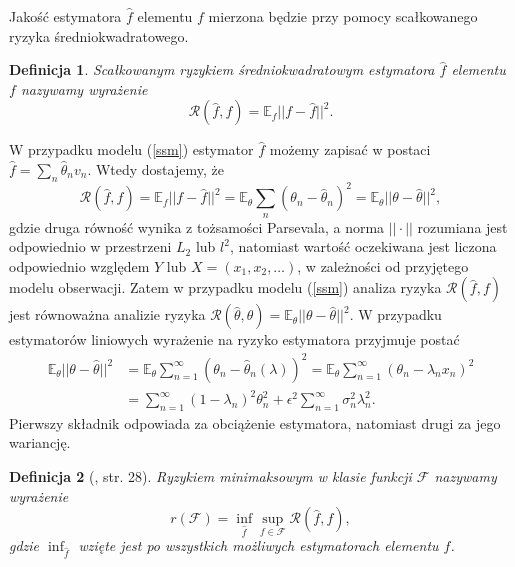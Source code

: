 \documentclass[man,mfiu]{mgrwms}
\newtheorem{df}{Definicja}[chapter]
\begin{document}
Jakość estymatora $\hat{f}$ elementu $f$ mierzona będzie przy pomocy scałkowanego ryzyka średniokwadratowego.
\begin{df}
Scałkowanym ryzykiem średniokwadratowym estymatora $\hat{f}$ elementu $f$ nazywamy wyrażenie
\begin{displaymath}
\mathcal{R}(\hat{f},f)=\mathbb{E}_f||f-\hat{f}||^2.
\end{displaymath}
\end{df}
W przypadku modelu (\ref{ssm}) estymator $\hat{f}$ możemy zapisać w postaci $\hat{f}=\sum_n\hat{\theta}_nv_n$. Wtedy dostajemy, że 
\begin{displaymath}
\mathcal{R}(\hat{f},f)=\mathbb{E}_f||f-\hat{f}||^2=\mathbb{E}_{\theta}\sum_n\left(\theta_n-\hat{\theta}_n\right)^2=\mathbb{E}_{\theta}||\theta-\hat{\theta}||^2,
\end{displaymath}
gdzie druga równość wynika z tożsamości Parsevala, a norma $||\cdot ||$ rozumiana jest odpowiednio w przestrzeni $L_2$ lub $l^2$, natomiast wartość oczekiwana jest liczona odpowiednio względem $Y$ lub $X=(x_1,x_2,\dots)$, w zależności od przyjętego modelu obserwacji. Zatem w przypadku modelu (\ref{ssm}) analiza ryzyka $\mathcal{R}(\hat{f},f)$ jest równoważna analizie ryzyka $\mathcal{R}(\hat{\theta},\theta)=\mathbb{E}_{\theta}||\theta-\hat{\theta}||^2$. W przypadku estymatorów liniowych wyrażenie na ryzyko estymatora przyjmuje postać 
\begin{equation}\label{risk}
\begin{split}
\mathbb{E}_{\theta}||\theta-\hat{\theta}||^2&=\mathbb{E}_{\theta}\sum_{n=1}^{\infty}\left(\theta_n-\hat{\theta}_n(\lambda)\right)^2=\mathbb{E}_{\theta}\sum_{n=1}^{\infty}\left(\theta_n-\lambda_nx_n\right)^2\\
&=\sum_{n=1}^{\infty}(1-\lambda_n)^2\theta_n^2+\epsilon^2\sum_{n=1}^{\infty}\sigma_n^2\lambda_n^2.
\end{split}
\end{equation}
Pierwszy składnik odpowiada za obciążenie estymatora, natomiast drugi za jego wariancję.\\
\begin{df}[\cite{iphde}, str. 28] Ryzykiem minimaksowym w klasie funkcji $\mathcal{F}$ nazywamy wyrażenie 
\begin{displaymath}
r(\mathcal{F})=\inf_{\hat{f}}\sup_{f\in \mathcal{F}}\mathcal{R}(\hat{f},f),
\end{displaymath}
gdzie $\inf_{\hat{f}}$ wzięte jest po wszystkich możliwych estymatorach elementu $f$.
\end{df}
\end{document}
